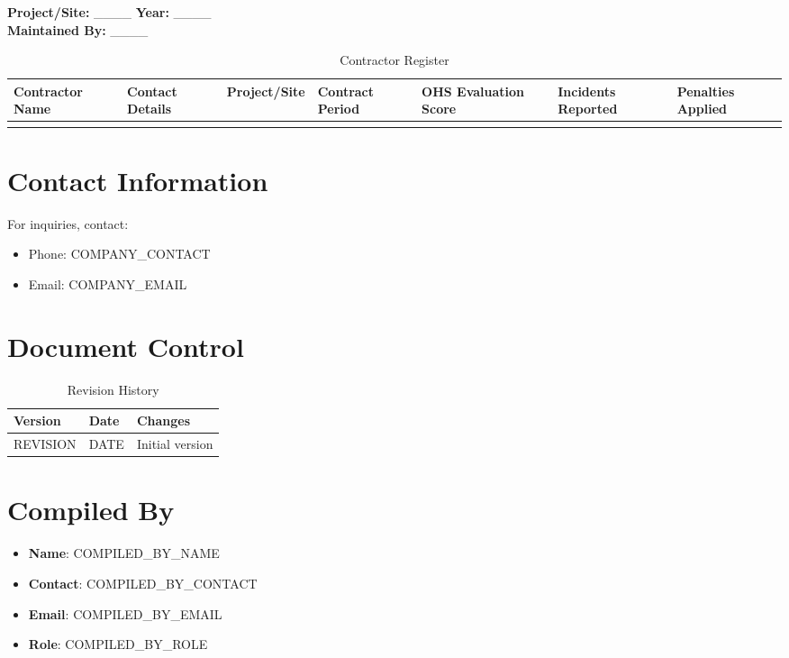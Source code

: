 \documentclass[12pt]{article}
\begin{document}
\textbf{Project/Site:} \_\_\_\_ \textbf{Year:} \_\_\_\_\\
\textbf{Maintained By:} \_\_\_\_

\begin{table}[h]
    \centering
    \begin{tabular}{p{2cm}p{2cm}p{2cm}p{2cm}p{2cm}p{2cm}p{2cm}}
        \toprule
        \textbf{Contractor Name} & \textbf{Contact Details} & \textbf{Project/Site} & \textbf{Contract Period} & \textbf{OHS Evaluation Score} & \textbf{Incidents Reported} & \textbf{Penalties Applied} \\
        \midrule
        & & & & & & \\
        \bottomrule
    \end{tabular}
    \caption{Contractor Register}
\end{table}

\section{Contact Information}
For inquiries, contact:
\begin{itemize}
    \item Phone: {{COMPANY_CONTACT}}
    \item Email: {{COMPANY_EMAIL}}
\end{itemize}

\section{Document Control}
\begin{table}[h]
    \centering
    \begin{tabular}{p{3cm}p{3cm}p{6cm}}
        \toprule
        \textbf{Version} & \textbf{Date} & \textbf{Changes} \\
        \midrule
        {{REVISION}} & {{DATE}} & Initial version \\
        \bottomrule
    \end{tabular}
    \caption{Revision History}
\end{table}

\section{Compiled By}
\begin{itemize}
    \item \textbf{Name}: {{COMPILED_BY_NAME}}
    \item \textbf{Contact}: {{COMPILED_BY_CONTACT}}
    \item \textbf{Email}: {{COMPILED_BY_EMAIL}}
    \item \textbf{Role}: {{COMPILED_BY_ROLE}}
\end{itemize}
\end{document}
